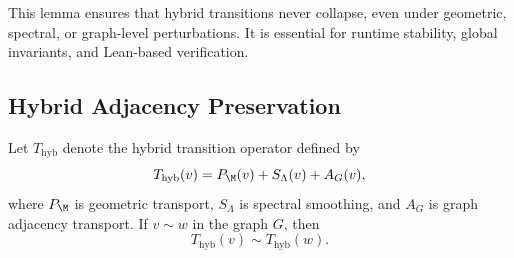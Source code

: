 \begin{remark}
This lemma ensures that hybrid transitions never collapse, even under
geometric, spectral, or graph-level perturbations. It is essential for
runtime stability, global invariants, and Lean-based verification.
\end{remark}

\subsection{Hybrid Adjacency Preservation}

\begin{lemma}
Let $T_{\mathrm{hyb}}$ denote the hybrid transition operator defined by
\[
T_{\mathrm{hyb}}(v)
=
P_\M(v)
+
S_\Lambda(v)
+
A_G(v),
\]
where $P_\M$ is geometric transport, $S_\Lambda$ is spectral smoothing, and
$A_G$ is graph adjacency transport.  
If $v \sim w$ in the graph $G$, then
\[
T_{\mathrm{hyb}}(v) \sim T_{\mathrm{hyb}}(w).
\]
\end{lemma}

